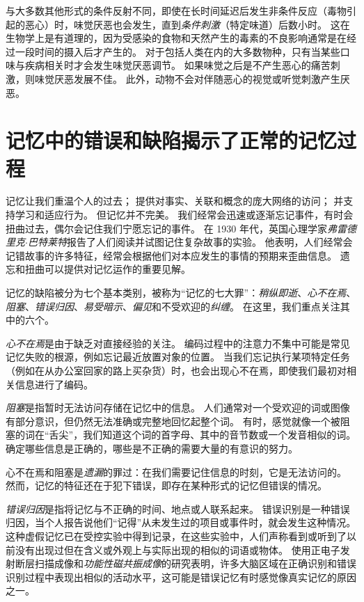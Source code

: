 与大多数其他形式的条件反射不同，即使在长时间延迟后发生非条件反应（毒物引起的恶心）时，味觉厌恶也会发生，直到\textit{条件刺激}（特定味道）后数小时。
这在生物学上是有道理的，因为受感染的食物和天然产生的毒素的不良影响通常是在经过一段时间的摄入后才产生的。
对于包括人类在内的大多数物种，只有当某些口味与疾病相关时才会发生味觉厌恶调节。
如果味觉之后是不产生恶心的痛苦刺激，则味觉厌恶发展不佳。
此外，动物不会对伴随恶心的视觉或听觉刺激产生厌恶。



\section{记忆中的错误和缺陷揭示了正常的记忆过程}

记忆让我们重温个人的过去； 提供对事实、关联和概念的庞大网络的访问； 并支持学习和适应行为。 但记忆并不完美。
我们经常会迅速或逐渐忘记事件，有时会扭曲过去，偶尔会记住我们宁愿忘记的事件。
在 1930 年代，英国心理学家\textit{弗雷德里克$\cdot$巴特莱特}报告了人们阅读并试图记住复杂故事的实验。
他表明，人们经常会记错故事的许多特征，经常会根据他们对本应发生的事情的预期来歪曲信息。
遗忘和扭曲可以提供对记忆运作的重要见解。


记忆的缺陷被分为七个基本类别，被称为“记忆的七大罪”：\textit{稍纵即逝}、\textit{心不在焉}、\textit{阻塞}、\textit{错误归因}、\textit{易受暗示}、\textit{偏见}和不受欢迎的\textit{纠缠}。
在这里，我们重点关注其中的六个。


\textit{心不在焉}是由于缺乏对直接经验的关注。
编码过程中的注意力不集中可能是常见记忆失败的根源，例如忘记最近放置对象的位置。
当我们忘记执行某项特定任务（例如在从办公室回家的路上买杂货）时，也会出现心不在焉，即使我们最初对相关信息进行了编码。


\textit{阻塞}是指暂时无法访问存储在记忆中的信息。
人们通常对一个受欢迎的词或图像有部分意识，但仍然无法准确或完整地回忆起整个词。
有时，感觉就像一个被阻塞的词在“舌尖”，我们知道这个词的首字母、其中的音节数或一个发音相似的词。
确定哪些信息是正确的，哪些是不正确的需要大量的有意识的努力。


心不在焉和阻塞是\textit{遗漏}的罪过：在我们需要记住信息的时刻，它是无法访问的。
然而，记忆的特征还在于犯下错误，即存在某种形式的记忆但错误的情况。


\textit{错误归因}是指将记忆与不正确的时间、地点或人联系起来。
错误识别是一种错误归因，当个人报告说他们“记得”从未发生过的项目或事件时，就会发生这种情况。
这种虚假记忆已在受控实验中得到记录，在这些实验中，人们声称看到或听到了以前没有出现过但在含义或外观上与实际出现的相似的词语或物体。
使用正电子发射断层扫描成像和\textit{功能性磁共振成像}的研究表明，许多大脑区域在正确识别和错误识别过程中表现出相似的活动水平，这可能是错误记忆有时感觉像真实记忆的原因之一。


